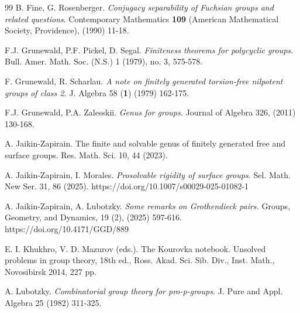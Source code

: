 \documentclass[a4paper,12pt]{article}
\begin{document}
{\begin{thebibliography}{99}
 B. Fine, G. Rosenberger. {\it Conjugacy separability of Fuchsian groups and related questions}.  Contemporary Mathematics {\bf 109} (American Mathematical Society, Providence), (1990) 11-18.

 F.J. Grunewald, P.F. Pickel, D. Segal. {\it Finiteness theorems for polycyclic groups.} Bull. Amer. Math. Soc. (N.S.) 1 (1979), no. 3, 575-578.

 F. Grunewald, R. Scharlau. {\it A note on finitely generated torsion-free nilpotent groups of class 2.} J. Algebra 58 (\textbf{1}) (1979) 162-175.

 F.J. Grunewald, P.A. Zalesskii. {\it Genus for groups.} Journal of Algebra 326, (2011) 130-168.


 A. Jaikin-Zapirain. The finite and solvable genus of finitely generated free and surface groups. Res. Math. Sci. 10, 44 (2023). 

 A. Jaikin-Zapirain, I. Morales. {\it Prosolvable rigidity of surface groups.} Sel. Math. New Ser. 31, 86 (2025). https://doi.org/10.1007/s00029-025-01082-1

 A. Jaikin-Zapirain, A. Lubotzky. {\it Some remarks on Grothendieck pairs.} Groups, Geometry, and Dynamics, 19 (2), (2025) 597-616. https://doi.org/10.4171/GGD/889






  E. I. Khukhro, V. D. Mazurov (eds.). The Kourovka notebook. Unsolved problems in group theory, 18th ed., Ross. Akad. Sci. Sib. Div., Inst. Math., Novosibirsk 2014, 227 pp.

 A. Lubotzky. {\it Combinatorial group theory for pro-p-groups.} J. Pure and Appl. Algebra 25 (1982) 311-325.


\end{thebibliography}}
\end{document}
